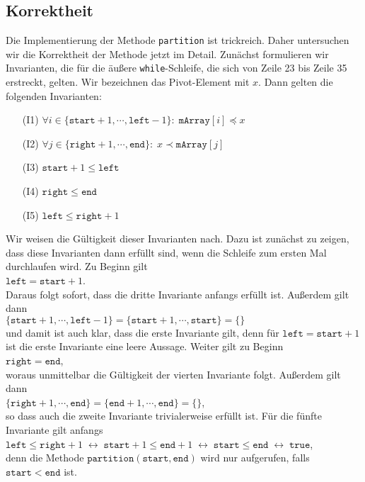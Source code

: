\subsection{Korrektheit}
Die Implementierung der Methode \texttt{partition} ist trickreich.  Daher untersuchen wir
die Korrektheit der Methode jetzt im Detail.  Zun\"achst formulieren wir Invarianten, die
f\"ur die \"au{\ss}ere \texttt{while}-Schleife, die sich von Zeile 23 bis Zeile 35 erstreckt,
gelten.   Wir bezeichnen das Pivot-Element mit $x$.  Dann gelten die folgenden Invarianten:
\begin{enumerate}
\item[(I1)] $\forall i \in \{ \mathtt{start}+1, \cdots, \mathtt{left} - 1 \} \colon\; \mathtt{mArray}[i] \preceq x$
\item[(I2)] $\forall j \in \{ \mathtt{right}+1, \cdots, \mathtt{end} \} \colon\; x \prec \mathtt{mArray}[j]$
\item[(I3)] $\mathtt{start}+1 \leq \mathtt{left}$ 
\item[(I4)] $\mathtt{right} \leq \mathtt{end}$ 
\item[(I5)] $\mathtt{left} \leq \mathtt{right} + 1$
\end{enumerate}
Wir weisen die G\"ultigkeit dieser Invarianten nach.  Dazu ist zun\"achst zu zeigen,
dass diese Invarianten dann erf\"ullt sind, wenn die Schleife zum ersten Mal durchlaufen wird.
Zu Beginn gilt \\[0.2cm]
\hspace*{1.3cm} $\texttt{left} = \mathtt{start} + 1$. \\[0.2cm]
Daraus folgt sofort, dass die dritte Invariante anfangs erf\"ullt ist.  Au{\ss}erdem gilt dann \\[0.2cm]
\hspace*{1.3cm} 
$\{ \mathtt{start}+1, \cdots, \mathtt{left}-1 \} = \{ \mathtt{start}+1, \cdots, \mathtt{start} \} = \{\}$
\\[0.2cm]
und damit ist auch klar, dass die erste Invariante gilt, denn f\"ur $\mathtt{left} = \mathtt{start}+1$
ist die erste Invariante eine leere Aussage.  Weiter gilt zu Beginn \\[0.2cm]
\hspace*{1.3cm} $\mathtt{right} = \mathtt{end}$,
\\[0.2cm]
woraus unmittelbar die G\"ultigkeit der vierten Invariante folgt.  Au{\ss}erdem gilt dann \\[0.2cm]
\hspace*{1.3cm} 
$\{ \mathtt{right}+1, \cdots, \mathtt{end} \} = \{ \mathtt{end}+1, \cdots, \mathtt{end} \} = \{\}$,
\\[0.2cm]
so dass auch die zweite Invariante trivialerweise erf\"ullt ist.  F\"ur die f\"unfte Invariante gilt anfangs
 \\[0.2cm]
\hspace*{1.3cm} 
$\mathtt{left} \leq \mathtt{right} + 1 \;\leftrightarrow\; \mathtt{start} + 1 \leq \mathtt{end} + 1 \;\leftrightarrow\;
  \mathtt{start} \leq \mathtt{end} \;\leftrightarrow\; \mathtt{true}$,
\\[0.2cm]
denn die Methode $\texttt{partition}(\texttt{start}, \texttt{end})$ wird nur aufgerufen,
falls $\mathtt{start} < \mathtt{end}$ ist.
\vspace*{0.3cm}

